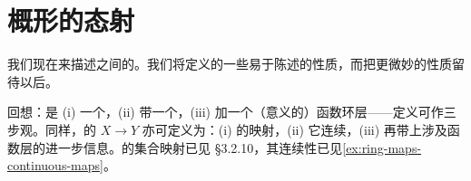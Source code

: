 
\chapter{概形的态射}
\label{ch:morphisms-of-schemes}

我们现在来描述\trScheme{}之间的\trMorphism。我们将定义\trMorphism{}的一些易于陈述的性质，而把更微妙的性质留待以后。

回想：\trScheme{}是 (i) 一个\trSet，(ii) 带一个\trTopology，(iii) 加一个（\trStructureSheaf{}意义的）函数环层——定义可作三步观。同样，\trScheme{}的\trMorphism{} $X\to Y$ 亦可定义为：(i) \trSet{}的映射，(ii) 它连续，(iii) 再带上涉及函数层的进一步信息。\trAffineScheme{}的集合映射已见 \S3.2.10，其连续性已见\cref{ex:ring-maps-continuous-maps}。








